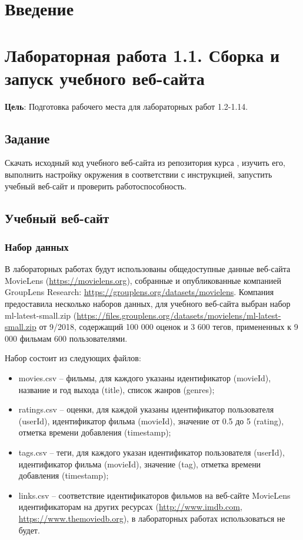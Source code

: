 \documentclass[a4paper,12pt]{report} %
\begin{document}
	\tableofcontents %
	
	\chapter* {Введение}
	\chapter {Лабораторная работа 1.1. Сборка и запуск учебного веб-сайта}
	\textbf{Цель}: Подготовка рабочего места для лабораторных работ 1.2-1.14.
	
	
	\section{Задание}
	Скачать исходный код учебного веб-сайта из репозитория курса \url{}, изучить его, выполнить настройку окружения в соответствии с инструкцией, запустить учебный веб-сайт и проверить работоспособность.
	\section{Учебный веб-сайт}
	\subsection{Набор данных}
	В лабораторных работах будут использованы общедоступные данные веб-сайта MovieLens (\url{https://movielens.org}), собранные и опубликованные компанией GroupLens Research: \url{https://grouplens.org/datasets/movielens}. Компания предоставила несколько наборов данных, для учебного веб-сайта выбран набор ml-latest-small.zip (\url{https://files.grouplens.org/datasets/movielens/ml-latest-small.zip} от 9/2018, содержащий 100 000 оценок и 3 600 тегов, примененных к 9 000 фильмам 600 пользователями.
	
	Набор состоит из следующих файлов:
	\begin{itemize}
		\item movies.csv -- фильмы, для каждого указаны идентификатор (movieId), название и год выхода (title), список жанров (genres);
		\item ratings.csv -- оценки, для каждой указаны идентификатор пользователя (userId), идентификатор фильма (movieId), значение от 0.5 до 5 (rating), отметка времени добавления (timestamp);
		\item tags.csv -- теги, для каждого указан идентификатор пользователя (userId), идентификатор фильма (movieId), значение (tag), отметка времени добавления (timestamp);
		\item links.csv -- соответствие идентификаторов фильмов на веб-сайте MovieLens идентификаторам на других ресурсах (\url{http://www.imdb.com}, \url{https://www.themoviedb.org}), в лабораторных работах использоваться не будет.
    \end{itemize}
\end{document}
